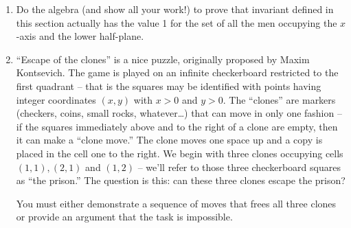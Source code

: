 \begin{enumerate}
\item Do the algebra (and show all your work!) to prove that invariant
defined in this section actually has the value 1 for the set of all the
men occupying the $x$-axis and the lower half-plane.

\item ``Escape of the clones'' is a  nice puzzle, originally proposed by Maxim Kontsevich.  The game
is played on an infinite checkerboard restricted to the first quadrant -- that is the squares may be 
identified with points having integer coordinates $(x,y)$ with $x>0$ and $y>0$.  The ``clones'' are markers
(checkers, coins, small rocks, whatever\ldots) that can move in only one fashion -- if the squares immediately
above and to the right of a clone are empty, then it can make a ``clone move.''   The clone moves one space
up and a copy is placed in the cell one to the right.  We begin with three clones occupying cells $(1,1), (2,1)$ and $(1,2)$ -- we'll refer to those three checkerboard squares as ``the prison.''  The question is this:  can these
three clones escape the prison?

You must either demonstrate a sequence of moves that frees all three clones or provide an argument that the task is impossible.

\end{enumerate}


